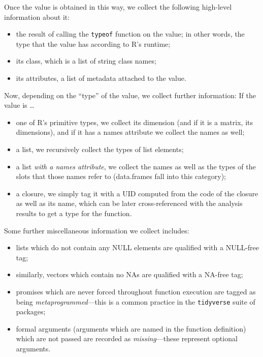 \documentclass[acmsmall,review,anonymous]{acmart}\settopmatter{printfolios=true,printccs=false,printacmref=false}
\begin{document}

Once the value is obtained in this way, we collect the following high-level information about it:

\begin{itemize}
\item the result of calling the {\tt typeof} function on the value; in other words, the type that the value has according to R's runtime;
\item its class, which is a list of string class names;
\item its attributes, a list of metadata attached to the value.
\end{itemize}

Now, depending on the ``type'' of the value, we collect further information:
If the value is \ldots

\begin{itemize}
\item one of R's primitive types, we collect its dimension (and if it is a matrix, its dimensions), and if it has a names attribute we collect the names as well;
\item a list, we recursively collect the types of list elements;
\item a list {\it with a names attribute}, we collect the names as well as the types of the slots that those names refer to (data.frames fall into this category);
\item a closure, we simply tag it with a UID computed from the code of the closure as well as its name, which can be later cross-referenced with the analysis results to get a type for the function.
\end{itemize}

Some further miscellaneous information we collect includes:

\begin{itemize}
\item lists which do not contain any NULL elements are qualified with a NULL-free tag; 
\item similarly, vectors which contain no NAs are qualified with a NA-free tag;
\item promises which are never forced throughout function execution are tagged as being {\it metaprogrammed}---this is a common practice in the {\tt tidyverse} suite of packages;
\item formal arguments (arguments which are named in the function definition) which are not passed are recorded as {\it missing}---these represent optional arguments.
\end{itemize}
\end{document}
